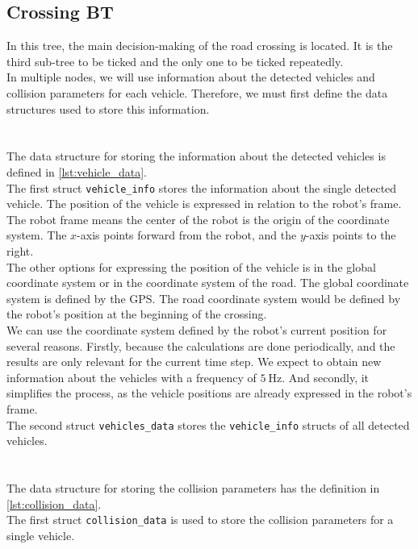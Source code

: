 \subsection{Crossing BT}
\label{sec:Crossing-BT-impl}
    In this tree, the main decision-making of the road crossing is located. It is the third sub-tree to be ticked and the only one to be ticked repeatedly.\\
    In multiple nodes, we will use information about the detected vehicles and collision parameters for each vehicle. Therefore, we must first define the data structures used to store this information.\\\\
    \\
        The data structure for storing the information about the detected vehicles is defined in \ref{lst:vehicle_data}.\\
        The first struct \texttt{vehicle\_info} stores the information about the single detected vehicle. The position of the vehicle is expressed in relation to the robot's frame. The robot frame means the center of the robot is the origin of the coordinate system. The $x$-axis points forward from the robot, and the $y$-axis points to the right.\\
        The other options for expressing the position of the vehicle is in the global coordinate system or in the coordinate system of the road. The global coordinate system is defined by the GPS. The road coordinate system would be defined by the robot's position at the beginning of the crossing.\\
        We can use the coordinate system defined by the robot's current position for several reasons. Firstly, because the calculations are done periodically, and the results are only relevant for the current time step. We expect to obtain new information about the vehicles with a frequency of $5\:\si{\Hz}$. And secondly, it simplifies the process, as the vehicle positions are already expressed in the robot's frame.\\
        The second struct \texttt{vehicles\_data} stores the \texttt{vehicle\_info} structs of all detected vehicles.\\\\
    \\
        The data structure for storing the collision parameters has the definition in \ref{lst:collision_data}.\\
        The first struct \texttt{collision\_data} is used to store the collision parameters for a single vehicle.\\
